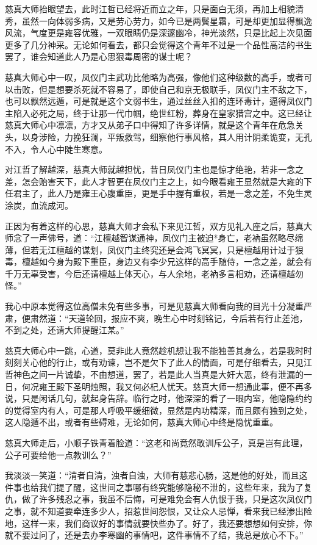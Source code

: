 慈真大师抬眼望去，此时江哲已经将近而立之年，只是面白无须，再加上相貌清秀，虽然一向体弱多病，又是劳心劳力，如今已是两鬓星霜，可是却更加显得飘逸风流，气度更是雍容优雅，一双眼睛仍是深邃幽冷，神光淡然，只是比起上次见面更多了几分神采。无论如何看去，都只会觉得这个青年不过是一个品性高洁的书生罢了，谁会知道此人乃是心思狠毒周密的谋士呢？

慈真大师心中一叹，凤仪门主武功比他略为高强，像他们这种级数的高手，或者可以击败，但是想要杀死就不容易了，即使自己和京无极联手，凤仪门主不敌之下，也可以飘然远遁，可是就是这个文弱书生，通过丝丝入扣的连环毒计，逼得凤仪门主陷入必死之局，终于让那一代巾帼，绝世红粉，葬身在皇家猎宫之中。这已经让慈真大师心中凛凛，方才又从弟子口中得知了许多详情，就是这个青年在危急关头，以身涉险，力挽狂澜，平叛救驾，细察他行事风格，其人用计阴柔诡变，无孔不入，令人心中陡生寒意。

对江哲了解越深，慈真大师就越担忧，昔日凤仪门主也是惊才绝艳，若非一念之差，怎会贻害天下，此人才智更在凤仪门主之上，如今眼看雍王显然就是大雍的下任君主了，此人乃是雍王心腹重臣，更是手中握有重权，若是一念之差，不免生灵涂炭，血流成河。

正因为有着这样的心思，慈真大师才会私下来见江哲，双方见礼入座之后，慈真大师念了一声佛号，道：“江檀越智谋通神，凤仪门主被迫*身亡，老衲虽然略尽绵薄，但若无江檀越的谋划，凤仪门主终究还是会鸿飞冥冥，只是檀越用计过于狠毒，檀越如今身为殿下重臣，身边又有李少兄这样的高手随侍，一念之差，就会有千万无辜受害，今后还请檀越上体天心，与人余地，老衲多言相劝，还请檀越勿怪。”

我心中原本觉得这位高僧未免有些多事，可是见慈真大师看向我的目光十分凝重严肃，便肃然道：“天道轮回，报应不爽，晚生心中时刻铭记，今后若有行止差池，不到之处，还请大师提醒江某。”

慈真大师心中一跳，心道，莫非此人竟然趁机想让我不能独善其身么，若是我时时刻刻关心他的行止，或有劝谏，岂不是欠下了此人的情面，可是仔细看去，只见江哲神色之间一片诚挚，不由想道，罢了，若是此人当真是大奸大恶，终有泄漏的一日，何况雍王殿下圣明烛照，我又何必杞人忧天。慈真大师一想通此事，便不再多说，只是闲话几句，就起身告辞。临行之时，他深深的看了一眼内室，他隐隐约约的觉得室内有人，可是那人呼吸平缓细微，显然是内功精深，而且颇有独到之处，这人隐遁不出，或者有些碍难，无论如何，慈真大师心中终是隐忧重重。

慈真大师走后，小顺子铁青着脸道：“这老和尚竟然敢训斥公子，真是岂有此理，公子可要给他一点教训么？”

我淡淡一笑道：“清者自清，浊者自浊，大师有慈悲心肠，这是他的好处，而且这件事也给我们提了醒，这世间之事哪有终究能够隐秘不泄的，这些年来，我为了复仇，做了许多残忍之事，我虽不后悔，可是难免会有人仇恨于我，只是这次凤仪门之事，就不知道要牵连多少人，招惹世间怨恨，又让众人忌惮，看来我已经渗出险地，这样一来，我们商议好的事情就要快些办了。好了，我还要想想如何安排，你就不要过问了，还是去办李寒幽的事情吧，这件事情不了结，我总是放心不下。”

